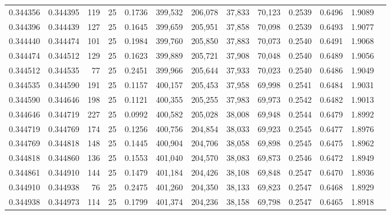 \begin{tabular}{rrrrrrrrrrrrr}
0.344356 & 0.344395 &   119 &  25 &                                     0.1736 & 399,532 & 206,078 &  37,833 &  70,123 & 0.2539 & 0.6496 & 1.9089 \\
0.344396 & 0.344439 &   127 &  25 &                                     0.1645 & 399,659 & 205,951 &  37,858 &  70,098 & 0.2539 & 0.6493 & 1.9077 \\
0.344440 & 0.344474 &   101 &  25 &                                     0.1984 & 399,760 & 205,850 &  37,883 &  70,073 & 0.2540 & 0.6491 & 1.9068 \\
0.344474 & 0.344512 &   129 &  25 &                                     0.1623 & 399,889 & 205,721 &  37,908 &  70,048 & 0.2540 & 0.6489 & 1.9056 \\
0.344512 & 0.344535 &    77 &  25 &                                     0.2451 & 399,966 & 205,644 &  37,933 &  70,023 & 0.2540 & 0.6486 & 1.9049 \\
0.344535 & 0.344590 &   191 &  25 &                                     0.1157 & 400,157 & 205,453 &  37,958 &  69,998 & 0.2541 & 0.6484 & 1.9031 \\
0.344590 & 0.344646 &   198 &  25 &                                     0.1121 & 400,355 & 205,255 &  37,983 &  69,973 & 0.2542 & 0.6482 & 1.9013 \\
0.344646 & 0.344719 &   227 &  25 &                                     0.0992 & 400,582 & 205,028 &  38,008 &  69,948 & 0.2544 & 0.6479 & 1.8992 \\
0.344719 & 0.344769 &   174 &  25 &                                     0.1256 & 400,756 & 204,854 &  38,033 &  69,923 & 0.2545 & 0.6477 & 1.8976 \\
0.344769 & 0.344818 &   148 &  25 &                                     0.1445 & 400,904 & 204,706 &  38,058 &  69,898 & 0.2545 & 0.6475 & 1.8962 \\
0.344818 & 0.344860 &   136 &  25 &                                     0.1553 & 401,040 & 204,570 &  38,083 &  69,873 & 0.2546 & 0.6472 & 1.8949 \\
0.344861 & 0.344910 &   144 &  25 &                                     0.1479 & 401,184 & 204,426 &  38,108 &  69,848 & 0.2547 & 0.6470 & 1.8936 \\
0.344910 & 0.344938 &    76 &  25 &                                     0.2475 & 401,260 & 204,350 &  38,133 &  69,823 & 0.2547 & 0.6468 & 1.8929 \\
0.344938 & 0.344973 &   114 &  25 &                                     0.1799 & 401,374 & 204,236 &  38,158 &  69,798 & 0.2547 & 0.6465 & 1.8918 \\

\end{tabular}
